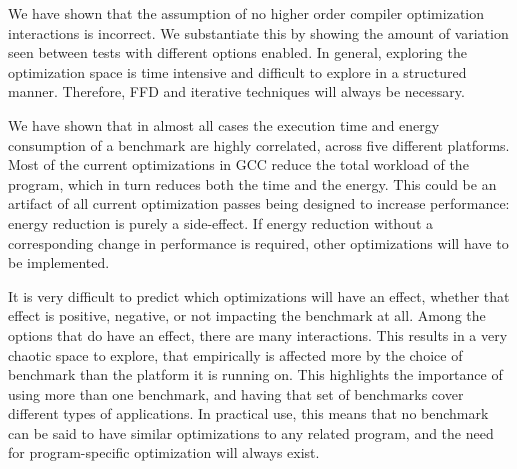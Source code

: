 \documentclass[twocolumn]{article}
\begin{document}
We have shown that the assumption of no higher order compiler optimization interactions is incorrect. We substantiate this by showing the amount of variation seen between tests with different options enabled. In general, exploring the optimization space is time intensive and difficult to explore in a structured manner. Therefore, FFD and iterative techniques will always be necessary.

We have shown that in almost all cases the execution time and energy consumption of a benchmark are highly correlated, across five different platforms. Most of the current optimizations in GCC reduce the total workload of the program, which in turn reduces both the time and the energy. This could be an artifact of all current optimization passes being designed to increase performance: energy reduction is purely a side-effect. If energy reduction without a corresponding change in performance is required, other optimizations will have to be implemented.

It is very difficult to predict which optimizations will have an effect, whether that effect is positive, negative, or not impacting the benchmark at all. Among the options that do have an effect, there are many interactions. This results in a very chaotic space to explore, that empirically is affected more by the choice of benchmark than the platform it is running on. This highlights the importance of using more than one benchmark, and having that set of benchmarks cover different types of applications. In practical use, this means that no benchmark can be said to have similar optimizations to any related program, and the need for program-specific optimization will always exist.

\printbibliography
\end{document}
